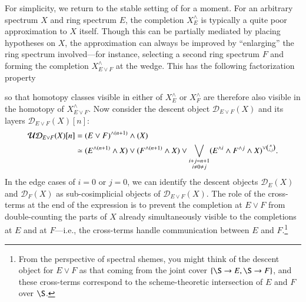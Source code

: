 For simplicity, we return to the stable setting of  for a moment.  For an arbitrary spectrum $X$ and ring spectrum $E$, the completion $X^\wedge_E$ is typically a quite poor approximation to $X$ itself.  Though this can be partially mediated by placing hypotheses on $X$, the approximation can always be improved by ``enlarging'' the ring spectrum involved---for instance, selecting a second ring spectrum $F$ and forming the completion $X^\wedge_{E \vee F}$ at the wedge.  This has the following factorization property
\begin{center}
\end{center}
so that homotopy classes visible in either of $X^\wedge_E$ or $X^\wedge_F$ are therefore also visible in the homotopy of $X^\wedge_{E \vee F}$.  Now consider the descent object $\mathcal D_{E \vee F}(X)$ and its layers $\mathcal D_{E \vee F}(X)[n]$:
\begin{align*}
\mathcal{UD}_{E \vee F}(X)[n] & = (E \vee F)^{\wedge (n+1)} \wedge (X) \\
& \simeq (E^{\wedge (n+1)} \wedge X) \vee (F^{\wedge (n+1)} \wedge X) \vee \bigvee_{\substack{i+j=n+1 \\ i \ne 0 \ne j}} (E^{\wedge i} \wedge F^{\wedge j} \wedge X)^{\vee \binom{n}{i,j}}.
\end{align*}
In the edge cases of $i = 0$ or $j = 0$, we can identify the descent objects $\mathcal D_E(X)$ and $\mathcal D_F(X)$ as sub-cosimplicial objects of $\mathcal D_{E \vee F}(X)$.  The role of the cross-terms at the end of the expression is to prevent the completion at $E \vee F$ from double-counting the parts of $X$ already simultaneously visible to the completions at $E$ and at $F$---i.e., the cross-terms handle communication between $E$ and $F$.\footnote{From the perspective of spectral shemes, you might think of the descent object for $E \vee F$ as that coming from the joint cover $\{\S \to E, \S \to F\}$, and these cross-terms correspond to the scheme-theoretic intersection of $E$ and $F$ over $\S$.}

